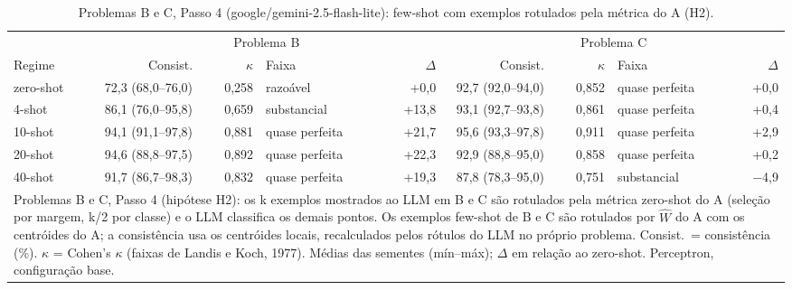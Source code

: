 \begin{table}[htbp]
\centering
\small
\caption{Problemas B e C, Passo 4 (google/gemini-2.5-flash-lite): few-shot com exemplos rotulados pela métrica do A (H2).}
\label{tab:bloco1_BC_passo4_exemplos_da_metrica_flashlite}
\begin{tabular}{lrrlrrrlr}
\toprule
 & \multicolumn{4}{c}{Problema B} & \multicolumn{4}{c}{Problema C} \\ \cmidrule(lr){2-5} \cmidrule(lr){6-9}
Regime & Consist. & $\kappa$ & Faixa & $\Delta$ & Consist. & $\kappa$ & Faixa & $\Delta$ \\
\midrule
zero-shot & 72,3 (68,0–76,0) & 0,258 & razoável & +0,0 & 92,7 (92,0–94,0) & 0,852 & quase perfeita & +0,0 \\
4-shot & 86,1 (76,0–95,8) & 0,659 & substancial & +13,8 & 93,1 (92,7–93,8) & 0,861 & quase perfeita & +0,4 \\
10-shot & 94,1 (91,1–97,8) & 0,881 & quase perfeita & +21,7 & 95,6 (93,3–97,8) & 0,911 & quase perfeita & +2,9 \\
20-shot & 94,6 (88,8–97,5) & 0,892 & quase perfeita & +22,3 & 92,9 (88,8–95,0) & 0,858 & quase perfeita & +0,2 \\
40-shot & 91,7 (86,7–98,3) & 0,832 & quase perfeita & +19,3 & 87,8 (78,3–95,0) & 0,751 & substancial & $-$4,9 \\
\bottomrule
\multicolumn{9}{p{0.95\linewidth}}{\footnotesize Problemas B e C, Passo 4 (hipótese H2): os k exemplos mostrados ao LLM em B e C são rotulados pela métrica zero-shot do A (seleção por margem, k/2 por classe) e o LLM classifica os demais pontos. Os exemplos few-shot de B e C são rotulados por $\hat{W}$ do A com os centróides do A; a consistência usa os centróides locais, recalculados pelos rótulos do LLM no próprio problema. Consist.\ = consistência (\%). $\kappa$ = Cohen's $\kappa$ (faixas de Landis e Koch, 1977). Médias das sementes (mín–máx); $\Delta$ em relação ao zero-shot. Perceptron, configuração base.} \\
\end{tabular}
\end{table}
